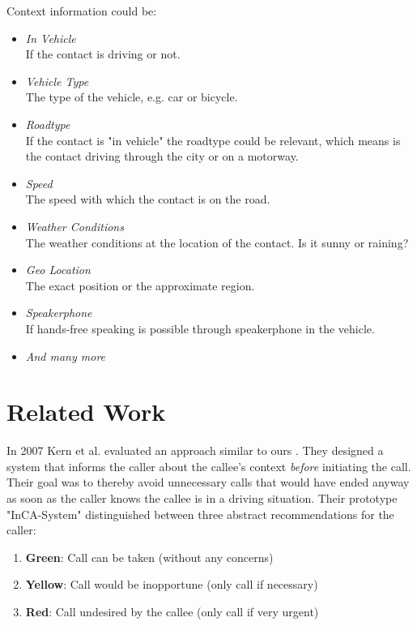 \documentclass{sigchi}
\begin{document}
Context information could be:
\begin{itemize}
	\item \textit{In Vehicle}\\
	If the contact is driving or not.
	\item \textit{Vehicle Type}\\
	The type of the vehicle, e.g. car or bicycle.
	\item \textit{Roadtype}\\
	If the contact is "in vehicle" the roadtype could be relevant, which means is the contact driving through the city or on a motorway.
	\item \textit{Speed}\\
	The speed with which the contact is on the road.
	\item \textit{Weather Conditions}\\
	The weather conditions at the location of the contact. Is it sunny or raining?
	\item \textit{Geo Location}\\
	The exact position or the approximate region.
	\item \textit{Speakerphone}\\
	If hands-free speaking is possible through speakerphone in the vehicle.
	\item \textit{And many more}
\end{itemize}

\section{Related Work}

 In 2007 Kern et al. evaluated an approach similar to ours \cite{kern07}. They designed a system that informs the caller about the callee's context \textit{before} initiating the call. Their goal was to thereby avoid unnecessary calls that would have ended anyway as soon as the caller knows the callee is in a driving situation. Their prototype "InCA-System" distinguished between three abstract recommendations for the caller:
 
 \begin{enumerate}
\item \textbf{Green}: Call can be taken (without any concerns)
\item \textbf{Yellow}: Call would be inopportune (only call if necessary)
\item \textbf{Red}: Call undesired by the callee (only call if very urgent)
\end{enumerate}
 
\end{document}
